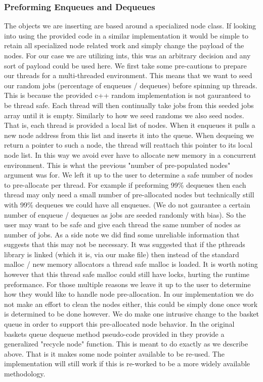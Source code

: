 \documentclass[conference]{IEEEtran}
\begin{document}
\subsubsection{Preforming Enqueues and Dequeues}
The objects we are inserting are based around a specialized node class.  If looking into using the provided code in a similar implementation it would be simple to retain all specialized node related work and simply change the payload of the nodes.  For our case we are utilizing ints, this was an arbitrary decision and any sort of payload could be used here.  We first take some pre-cautions to prepare our threads for a multi-threaded environment.  This means that we want to seed our random jobs (percentage of enqueues / dequeues) before spinning up threads.  This is because the provided c++ random implementation is not gauranteed to be thread safe.  Each thread will then continually take jobs from this seeded jobs array until it is empty.  \break
Similarly to how we seed randoms we also seed nodes.  That is, each thread is provided a local list of nodes.  When it enqueues it pulls a new node address from this list and inserts it into the queue.  When dequeing we return a pointer to such a node, the thread will reattach this pointer to its local node list.  In this way we avoid ever have to allocate new memory in a concurrent environment.  This is what the previous "number of pre-populated nodes" argument was for.  We left it up to the user to determine a safe number of nodes to pre-allocate per thread.  For example if preforming 99\% dequeues then each thread may only need a small number of pre-allocated nodes but technically still with 99\% dequeues we could have all enqueues.  (We do not gaurantee a certain number of enqueue / dequeues as jobs are seeded randomly with bias).  So the user may want to be safe and give each thread the same number of nodes as number of jobs.  As a side note we did find some unreliable information that suggests that this may not be necessary.  It was suggested that if the pthreads library is linked (which it is, via our make file) then instead of the standard malloc / new memory allocators a thread safe malloc is loaded.  It is worth noting however that this thread safe malloc could still have locks, hurting the runtime preformance.  For those multiple reasons we leave it up to the user to determine how they would like to handle node pre-allocation.  In our implementation we do not make an effort to clean the nodes either, this could be simply done once work is determined to be done however.\break
We do make one intrusive change to the basket queue in order to support this pre-allocated node behavior.  In the original baskets queue dequeue method pseudo-code provided in \cite{baskets} they provide a generalized "recycle node" function.  This is meant to do exactly as we describe above.  That is it makes some node pointer available to be re-used.  The implementation will still work if this is re-worked to be a more widely available methodology.
\end{document}
